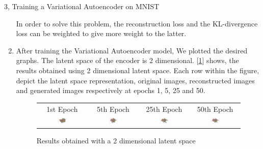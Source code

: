 \documentclass[10pt,a4paper]{article}
\begin{document}
\begin{task}{3, Training a Variational Autoencoder on MNIST}
\begin{enumerate}
	In order to solve this problem, the reconstruction loss and the KL-divergence loss can be weighted to give more weight to the latter.
	
	\item After training the Variational Autoencoder model, We plotted the desired graphs. The latent space of the encoder is 2 dimensional. [\ref{fig:latent-2}] shows, the results obtained using 2 dimensional latent space. Each row within the figure, depict the latent space representation, original images, reconstructed images and generated images respectively at epochs 1, 5, 25 and 50.

\begin{figure}[H]
\caption{Results obtained with a 2 dimensional latent space}
\label{fig:latent-2} 
\begin{tabular}{cccc}
1st Epoch & 5th Epoch & 25th Epoch & 50th Epoch \\
  \includegraphics[width=0.23\textwidth]{../plots/task3/latent_epoch1_latent2.png} &   \includegraphics[width=0.23\textwidth]{../plots/task3/latent_epoch5_latent2.png} & \includegraphics[width=0.23\textwidth]{../plots/task3/latent_epoch25_latent2.png} &   \includegraphics[width=0.23\textwidth]{../plots/task3/latent_epoch50_latent2.png} \\

\end{tabular}
\end{figure}
\end{enumerate}
\end{task}
\end{document}
